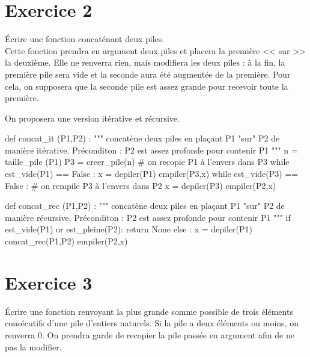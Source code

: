 \else\fi

\section*{Exercice 2}

\ifprof
\else
Écrire une fonction concaténant deux piles. \\
Cette fonction prendra en argument deux piles et placera la première << sur >> la deuxième. Elle ne renverra rien, mais 
modifiera les deux piles : à la fin, la première pile sera vide et la seconde aura été augmentée de la première. Pour 
cela, on supposera que la seconde pile est assez grande pour recevoir toute la première.

On proposera une version itérative et récursive.
\fi

\ifprof

\begin{corrige}

\begin{python}

def concat_it (P1,P2) :
    """ concatène deux piles en plaçant P1 "sur" P2
    de manière itérative.
    Préconditon : P2 est assez profonde pour contenir P1 """
    n = taille_pile (P1)
    P3 = creer_pile(n) # on recopie P1 à l'envers dans P3
    while est_vide(P1) == False :
        x = depiler(P1)
        empiler(P3,x)
    while est_vide(P3) == False : # on rempile P3 à l'envers dans P2
        x = depiler(P3)
        empiler(P2,x)

def concat_rec (P1,P2) :
    """ concatène deux piles en plaçant P1 "sur" P2
    de manière récursive.
    Préconditon : P2 est assez profonde pour contenir P1 """
    if est_vide(P1) or est_pleine(P2):
        return None
    else :
        x = depiler(P1)
        concat_rec(P1,P2)
        empiler(P2,x)
        
\end{python} 

\end{corrige}

\else
\fi

\section*{Exercice 3}

\ifprof\else
Écrire une fonction renvoyant la plus grande somme possible de trois éléments consécutifs d'une pile d'entiers 
naturels. Si la pile a deux éléments ou moins, on renverra 0. On prendra garde de recopier la pile passée en argument 
afin de ne pas la modifier.
\fi


